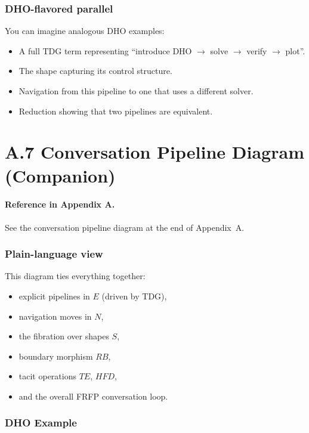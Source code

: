 \subsubsection*{DHO-flavored parallel}

You can imagine analogous DHO examples:

\begin{itemize}
 \item A full TDG term representing ``introduce DHO $\to$ solve $\to$ verify $\to$ plot''.
 \item The shape capturing its control structure.
 \item Navigation from this pipeline to one that uses a different solver.
 \item Reduction showing that two pipelines are equivalent.
\end{itemize}

\newpage

\section{A.7 Conversation Pipeline Diagram (Companion)}

\paragraph{Reference in Appendix A.}
See the conversation pipeline diagram at the end of Appendix~A.

\subsubsection*{Plain-language view}

This diagram ties everything together:

\begin{itemize}
 \item explicit pipelines in $E$ (driven by TDG),
 \item navigation moves in $N$,
 \item the fibration over shapes $S$,
 \item boundary morphism $RB$,
 \item tacit operations $TE$, $HFD$,
 \item and the overall FRFP conversation loop.
\end{itemize}

\subsubsection*{DHO Example}


